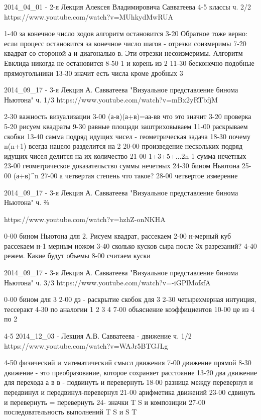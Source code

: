 2014_04_01 - 2-я Лекция Алексея Владимировича Савватеева 4-5 классы ч. 2/2
https://www.youtube.com/watch?v=MUhkydMwRUA

1-40 за конечное число ходов алгоритм остановится
3-20 Обратное тоже верно: если процесс остановится за конечное число шагов - отрезки соизмеримы
7-20 квадрат со стороной а и диагональю в. Эти отрезки несоизмеримы. Алгоритм Евклида никогда не остановится
8-50 1 и корень из 2
11-30 бесконечно подобные прямоугольники
13-30 значит есть числа кроме дробных
3


2014_09_17 - 3-я Лекция А. Савватеева "Визуальное представление бинома Ньютона" ч. 1/3
https://www.youtube.com/watch?v=mBx2yRTbfjM

2-30 важность визуализации
3-00 (а-в)(а+в)=аа-вв что это значит
3-20 проверка
5-20 рисуем квадраты
9-30 равные площади заштриховываем
11-00 раскрываем скобки
13-40 самма подряд идущих чисел - геометрическая задача
18-30 почему n(n+1) всегда нацело разделится на 2
20-00 произведение нескольких подряд идущих чисел делится на их количество
21-00 1+3+5+...2n-1 сумма нечетных
23-00 геометрическое доказательство суммы нечетных
24-30 бином Ньютона
25-00 (а+в)^n
27-00 а четвертая степень что такое?
28-00 четвертое измерение

2014_09_17 - 3-я Лекция А. Савватеева "Визуальное представление бинома Ньютона" ч. ⅔

https://www.youtube.com/watch?v=hzhZ-onNKHA

0-00 бином Ньютона для 2. Рисуем квадрат, рассекаем
2-00 н-мерный куб рассекаем н-1 мерным ножом
3-40 сколько кусков сыра после 3х разрезаний?
4-40 режем. Какие будут объемы
8-00 считаем куски

2014_09_17 - 3-я Лекция А. Савватеева "Визуальное представление бинома Ньютона" ч. 3/3
https://www.youtube.com/watch?v=-iGPlMofsfA

0-00 бином для 3
2-00 дз - раскрытие скобок для 3
2-30 четырехмерная интуиция, тессеракт
4-30 по аналогии 1 2 3 4
7-00 объяснение коэффициентов
10-00  це из 4 по 2

4-5
2014_12_03 - Лекция А.В. Савватеева - движение ч. 1/2
https://www.youtube.com/watch?v=WAJr5BTGJLg

4-50 физический и математический смысл движения
7-00 движение прямой
8-30 движение - это преобразование, которое сохраняет расстояние
13-20 два движение для перехода а в в - подвинуть и перевернуть
18-00 разница между перевернул и передвинул и передвинул-перевернул
21-00 арифметика движений
23-00 сдвинуть и перевернуть = перевернуть
24- значки T S и композиции
27-00 последовательность выполнений T S и S T


